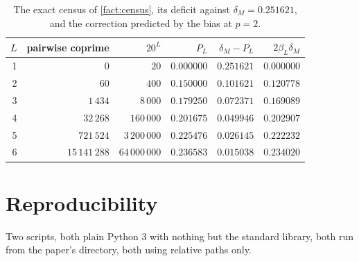 \documentclass[11pt]{amsart}
\theoremstyle{definition}
\theoremstyle{remark}
\begin{document}
\begin{table}[ht]
\centering
\begin{tabular}{rrrrrr}
\toprule
$L$ & pairwise coprime & $20^L$ & $P_L$ & $\delta_M-P_L$ & $2\beta_L\delta_M$\\
\midrule
1 & $0$ & $20$ & $0.000000$ & $0.251621$ & $0.000000$\\
2 & $60$ & $400$ & $0.150000$ & $0.101621$ & $0.120778$\\
3 & $1\,434$ & $8\,000$ & $0.179250$ & $0.072371$ & $0.169089$\\
4 & $32\,268$ & $160\,000$ & $0.201675$ & $0.049946$ & $0.202907$\\
5 & $721\,524$ & $3\,200\,000$ & $0.225476$ & $0.026145$ & $0.222232$\\
6 & $15\,141\,288$ & $64\,000\,000$ & $0.236583$ & $0.015038$ & $0.234020$\\
\bottomrule
\end{tabular}
\caption{The exact census of \cref{fact:census}, its deficit against $\delta_M=0.251621$, and the correction predicted by the bias at $p=2$.}
\label{tab:levels}
\end{table}

\section{Reproducibility}
\label{sec:repro}

Two scripts, both plain Python 3 with nothing but the standard library, both run from the paper's directory, both using relative paths only.
\end{document}
